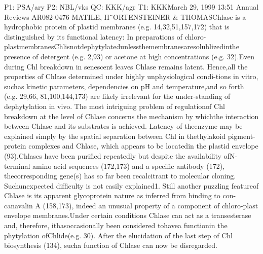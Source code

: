 \documentclass[a4paper, twocolumn, 11pt]{article}
\begin{document}
	P1: PSA/ary P2: NBL/vks QC: KKK/agr T1: KKKMarch 29, 1999 13:51 Annual Reviews AR082-0476 MATILE, H¨ORTENSTEINER \& THOMASChlase is a hydrophobic protein of plastid membranes (e.g. 14,32,51,157,172) that is distinguished by its functional latency: In preparations of chloro-plastmembranesChlisnotdephytylatedunlessthemembranesaresolublizedinthe presence of detergent (e.g. 2,93) or acetone at high concentrations (e.g. 32).Even during Chl breakdown in senescent leaves Chlase remains latent. Hence,all the properties of Chlase determined under highly unphysiological condi-tions in vitro, suchas kinetic parameters, dependencies on pH and temperature,and so forth (e.g. 29,66, 81,100,144,173) are likely irrelevant for the under-standing of dephytylation in vivo. The most intriguing problem of regulationof Chl breakdown at the level of Chlase concerns the mechanism by whichthe interaction between Chlase and its substrates is achieved. Latency of theenzyme may be explained simply by the spatial separation between Chl in thethylakoid pigment-protein complexes and Chlase, which appears to be locatedin the plastid envelope (93).Chlases have been puriﬁed repeatedly but despite the availability ofN-terminal amino acid sequences (172,173) and a speciﬁc antibody (172), thecorresponding gene(s) has so far been recalcitrant to molecular cloning. Suchunexpected difﬁculty is not easily explained1. Still another puzzling featureof Chlase is its apparent glycoprotein nature as inferred from binding to con-canavalin A (158,173), indeed an unusual property of a component of chloro-plast envelope membranes.Under certain conditions Chlase can act as a transesterase and, therefore, ithasoccasionally been considered tohavea functionin the phytylation ofChlide(e.g. 30). After the elucidation of the last step of Chl biosynthesis (134), sucha function of Chlase can now be disregarded.\\
	
\end{document}
